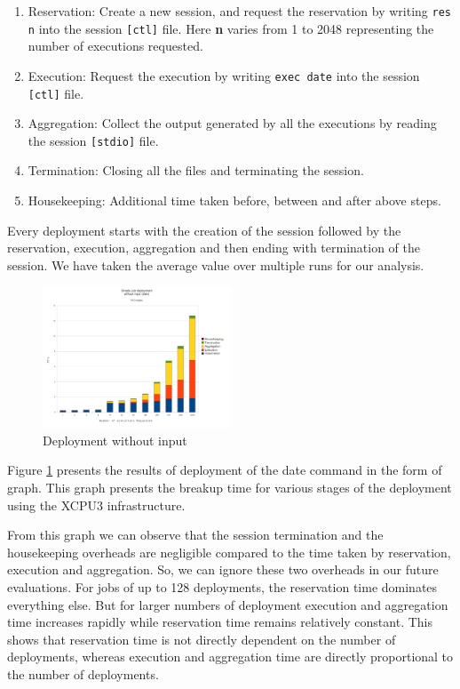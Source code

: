 \documentclass{sig-alternate}
\begin{document}
\begin{enumerate}
\item Reservation: Create a new session, and request the reservation by writing
\texttt{res n} into the session \texttt{[ctl]} file.  Here \textbf{n} varies
from 1 to 2048 representing the number of executions requested. 

\item Execution: Request the execution by writing \texttt{exec date} into the
session \texttt{[ctl]} file.

\item Aggregation: Collect the output generated by all the executions by reading
the session \texttt{[stdio]} file.

\item Termination: Closing all the files and terminating the session.

\item Housekeeping: Additional time taken before, between and after above steps.
\end{enumerate}
Every deployment starts with the creation of the session followed by the
reservation, execution, aggregation and then ending with termination of the
session.  We have taken the average value over multiple runs for our analysis.

\begin{figure}[h]
  \begin{center}
    \leavevmode
      \includegraphics[height=0.2\textheight,width=0.5\textwidth]
		{./img/date_graph}
    \caption{Deployment without input}
    \label{fig:date_graph}
  \end{center}
\end{figure}

Figure \ref{fig:date_graph} presents the results of deployment of the date
command in the form of graph.  This graph presents the breakup time for various
stages of the deployment using the XCPU3 infrastructure.

From this graph we can observe that the session termination and the housekeeping
overheads are negligible compared to the time taken by reservation, execution
and aggregation.  So, we can ignore these two overheads in our future
evaluations.  For jobs of up to 128 deployments, the reservation time dominates
everything else.  But for larger numbers of deployment execution and
aggregation time increases rapidly while reservation time remains relatively
constant. This shows that reservation time is not directly dependent on
the number of deployments, whereas execution and aggregation time are directly
proportional to the number of deployments.
\end{document}
